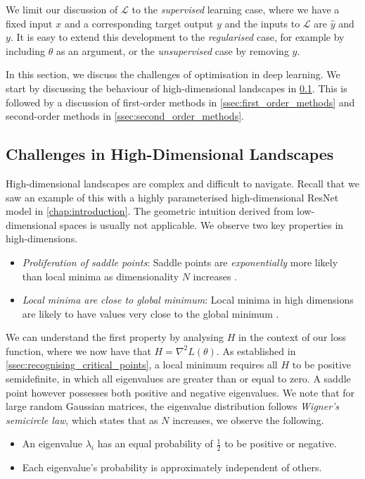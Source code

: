 We limit our discussion of $\mathcal{L}$ to the \textit{supervised} learning case, where we have a fixed input $x$ and a corresponding target output $y$ and the inputs to $\mathcal{L}$ are $\hat{y}$ and $y$. It is easy to extend this development to the \textit{regularised} case, for example by including $\theta$ as an argument, or the \textit{unsupervised} case by removing $y$. 

In this section, we discuss the challenges of optimisation in deep learning. We start by discussing the behaviour of high-dimensional landscapes in \cref{ssec:dl_challenges}. This is followed by a discussion of first-order methods in \cref{ssec:first_order_methods} and second-order methods in \cref{ssec:second_order_methods}.

\subsection{Challenges in High-Dimensional Landscapes}
\label{ssec:dl_challenges}

High-dimensional landscapes are complex and difficult to navigate. Recall that we saw an example of this with a highly parameterised high-dimensional ResNet model in \cref{chap:introduction}. The geometric intuition derived from low-dimensional spaces is usually not applicable. We observe two key properties in high-dimensions.
\begin{itemize}
    \item \textit{Proliferation of saddle points}: Saddle points are \textit{exponentially} more likely than local minima as dimensionality $N$ increases \citep{dauphin2014sfn}.
    \item \textit{Local minima are close to global minimum}: Local minima in high dimensions are likely to have values very close to the global minimum \citep{dauphin2014sfn,choromanska2015loss}.
\end{itemize}

We can understand the first property by analysing $H$ in the context of our loss function, where we now have that $H = \nabla^2 L(\theta)$. As established in \cref{ssec:recognising_critical_points}, a local minimum requires all $H$ to be positive semidefinite, in which all eigenvalues are greater than or equal to zero. A saddle point however possesses both positive and negative eigenvalues. We note that for large random Gaussian matrices, the eigenvalue distribution follows \textit{Wigner's semicircle law}, which states that as $N$ increases, we observe the following.
\begin{itemize}
    \item An eigenvalue $\lambda_i$ has an equal probability of $\frac{1}{2}$ to be positive or negative. 
    \item Each eigenvalue's probability is approximately independent of others.
\end{itemize}


